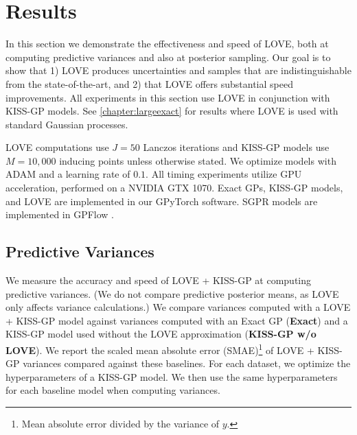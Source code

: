\section{Results}
\label{sec:love_results}

In this section we demonstrate the effectiveness and speed of LOVE{}, both at computing predictive variances and also at posterior sampling.
Our goal is to show that 1) LOVE{} produces uncertainties and samples that are indistinguishable from the state-of-the-art, and 2) that LOVE{} offers substantial speed improvements.
All experiments in this section use LOVE in conjunction with KISS-GP models.
See \cref{chapter:largeexact} for results where LOVE is used with standard Gaussian processes.

LOVE{} computations use $J=50$ Lanczos iterations
and KISS-GP models use $M\!=\!10,\!000$ inducing points unless otherwise stated.
We optimize models with ADAM \cite{kingma2014adam} and a learning rate of $0.1$.
All timing experiments utilize GPU acceleration, performed on a NVIDIA GTX 1070.
Exact GPs, KISS-GP models, and LOVE are implemented in our GPyTorch software.
SGPR models are implemented in GPFlow \cite{matthews2017gpflow}.

\subsection{Predictive Variances}
\label{sec:results_variances}

We measure the accuracy and speed of LOVE + KISS-GP{} at computing predictive variances.
(We do not compare predictive posterior means, as LOVE{} only affects variance calculations.)
We compare variances computed with a LOVE + KISS-GP{} model against variances computed with an Exact GP ({\bf Exact}) and a KISS-GP model used without the LOVE approximation ({\bf KISS-GP w/o LOVE}).
We report the scaled mean absolute error (SMAE)\footnote{
  Mean absolute error divided by the variance of $y$.
} \cite{rasmussen2006gaussian} of LOVE{} + KISS-GP variances compared against these baselines.
For each dataset, we optimize the hyperparameters of a KISS-GP model.
We then use the same hyperparameters for each baseline model when computing variances.

